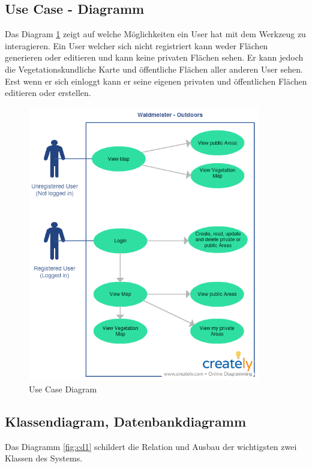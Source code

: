 \subsection{Use Case - Diagramm}
Das Diagram \ref{fig:uc1} zeigt auf welche M\"oglichkeiten ein User hat mit dem Werkzeug zu interagieren. Ein User welcher sich nicht registriert kann weder Fl\"achen generieren oder editieren und kann keine privaten Fl\"achen sehen. Er kann jedoch die Vegetationskundliche Karte und \"offentliche Fl\"achen aller anderen User sehen. Erst wenn er sich einloggt kann er seine eigenen privaten und \"offentlichen Fl\"achen editieren oder erstellen.
\begin{figure}[h]
\centering
    \includegraphics[width=0.9\textwidth]{WaldmeisterMap_USECASE}
    \caption{Use Case Diagram}
    \label{fig:uc1}
\end{figure}

\subsection{Klassendiagram, Datenbankdiagramm}
Das Diagramm \ref{fig:cd1}  schildert die Relation und Ausbau der wichtigsten zwei Klassen des Systems.

